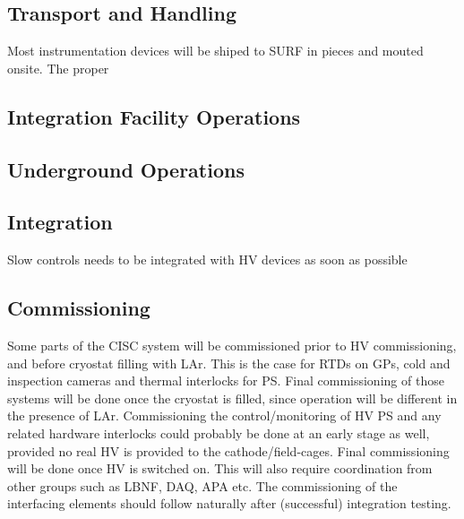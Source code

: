\subsection{Transport and Handling}
\label{sec:fdsp-slow-cryo-install-transport}

Most instrumentation devices will be shiped to SURF in pieces and mouted onsite. The proper 



\subsection{Integration Facility Operations}
\label{sec:fdsp-slow-cryo-install-facil-ops}


\subsection{Underground Operations}
\label{sec:fdsp-slow-cryo-install-undergr}


\subsection{Integration }
\label{sec:fdsp-slow-cryo-install-integration}

Slow controls needs to be integrated with HV devices as soon as possible 


\subsection{Commissioning}
\label{sec:fdsp-slow-cryo-install-commiss}


Some parts of the CISC system will be commissioned prior to HV commissioning, and before cryostat filling with LAr.
This is the case for RTDs on GPs, cold and inspection cameras and thermal interlocks for PS. Final commissioning of
those systems will be done once the cryostat is filled, since operation will be different in the presence of LAr.
Commissioning the control/monitoring of HV PS and any related hardware interlocks could probably be done at an early
stage as well, provided no real HV is provided to the cathode/field-cages. Final commissioning will be done once HV is
switched on. This will also require coordination from other groups such as LBNF, DAQ, APA etc. The commissioning of the
interfacing elements should follow naturally after (successful) integration testing.
